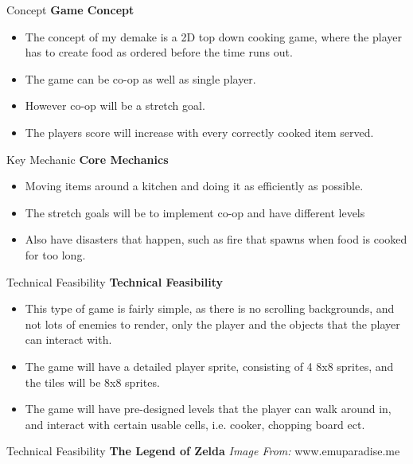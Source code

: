\documentclass{beamer}
\begin{document}
\begin{frame}{Concept}		
	\textbf{Game Concept} \pause
		\begin{itemize}
			\item The concept of my demake is a 2D top down cooking game, where the player has to create food as ordered before the time runs out. \pause
			\item The game can be co-op as well as single player. \pause
			\item However co-op will be a stretch goal. \pause
			\item The players score will increase with every correctly cooked item served. \pause
			
		\end{itemize}
\end{frame}

\begin{frame}{Key Mechanic}		
	\textbf{Core Mechanics} \pause
		\begin{itemize}
			\item Moving items around a kitchen and doing it as efficiently as possible.  \pause
			\item The stretch goals will be to implement co-op and have different levels \pause
			\item Also have disasters that happen, such as fire that spawns when food is cooked for too long. \pause
			

		\end{itemize}
\end{frame}

\begin{frame}{Technical Feasibility}		
	\textbf{Technical Feasibility} \pause
	
		\begin{itemize}
			\item This type of game is fairly simple, as there is no scrolling backgrounds, and not lots of enemies to render, only the player and the objects that the player can interact with. \pause
			\item The game will have a detailed player sprite, consisting of 4 8x8 sprites, and the tiles will be 8x8 sprites.  \pause
			\item The game will have pre-designed levels that the player can walk around in, and interact with certain usable cells, i.e. cooker, chopping board ect. \pause
			
		\end{itemize}
\end{frame}

\begin{frame}{Technical Feasibility}
    \textbf{The Legend of Zelda}
    \textit{Image From:} www.emuparadise.me
\end{frame}
\end{document}
